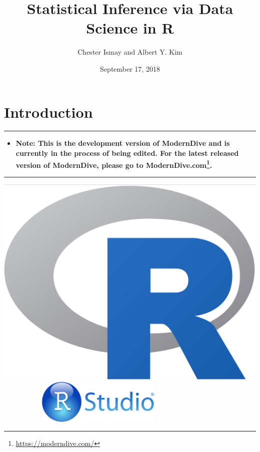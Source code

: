 \documentclass[12pt,]{krantz}
\title{Statistical Inference via Data Science in R}
\author{Chester Ismay and Albert Y. Kim}
\date{September 17, 2018}
\renewcommand{\href}[2]{#2\footnote{\url{#1}}}
\newenvironment{rmdblock}[1]
  {\begin{shaded*}
  \begin{itemize}
  \renewcommand{\labelitemi}{
    \raisebox{-.7\height}[0pt][0pt]{
    }
  }
  \item
  }
  {
  \end{itemize}
  \end{shaded*}
  }
\newenvironment{learncheck}
  {\begin{rmdblock}{warning}}
  {\end{rmdblock}}
\theoremstyle{definition}
\theoremstyle{definition}
\theoremstyle{definition}
\theoremstyle{remark}
\begin{document}
\maketitle


\thispagestyle{empty}

\begin{center}
\end{center}

\setlength{\abovedisplayskip}{-5pt}
\setlength{\abovedisplayshortskip}{-5pt}

{
\hypersetup{linkcolor=black}
\setcounter{tocdepth}{2}
\tableofcontents
}
\listoftables
\listoffigures
\mainmatter

\chapter{Introduction}\label{intro}

\begin{center}\rule{0.5\linewidth}{\linethickness}\end{center}

\begin{learncheck}
\textbf{Note: This is the development version of ModernDive and is
currently in the process of being edited. For the latest released
version of ModernDive, please go to
\href{https://moderndive.com/}{ModernDive.com}.}
\end{learncheck}

\begin{center}\rule{0.5\linewidth}{\linethickness}\end{center}

\includegraphics[height=0.20000\textwidth]{images/Rlogo.png} \hfill    
   
\includegraphics[width=0.45000\textwidth]{images/RStudio-Logo-Blue-Gradient.png}
\end{document}
